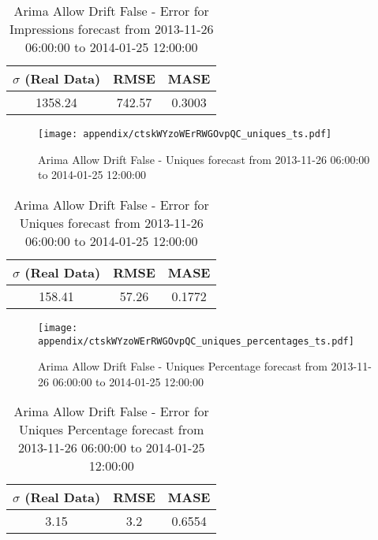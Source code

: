 \begin{table}[H]
\centering
\footnotesize
\begin{tabular}{ccc}
$\sigma$ (Real Data) & RMSE & MASE   \\ \hline
1358.24 & 742.57 & 0.3003 \\
\end{tabular}

\vspace{0.5cm}

\caption{
Arima Allow Drift False - Error for Impressions forecast from 2013-11-26 06:00:00 to 2014-01-25 12:00:00}
\end{table}

\begin{figure}[H] \begin{center} \leavevmode
\texttt{[image: appendix/ctskWYzoWErRWGOvpQC\_uniques\_ts.pdf]} \caption{
Arima Allow Drift False - Uniques forecast from 2013-11-26 06:00:00 to 2014-01-25 12:00:00} \label{fig:appendix/ctskWYzoWErRWGOvpQC_uniques_ts.pdf} \end{center}
\end{figure}

\begin{table}[H]
\centering
\footnotesize
\begin{tabular}{ccc}
$\sigma$ (Real Data) & RMSE & MASE   \\ \hline
158.41 & 57.26 & 0.1772 \\
\end{tabular}

\vspace{0.5cm}

\caption{
Arima Allow Drift False - Error for Uniques forecast from 2013-11-26 06:00:00 to 2014-01-25 12:00:00}
\end{table}

\begin{figure}[H] \begin{center} \leavevmode
\texttt{[image: appendix/ctskWYzoWErRWGOvpQC\_uniques\_percentages\_ts.pdf]} \caption{
Arima Allow Drift False - Uniques Percentage forecast from 2013-11-26 06:00:00 to 2014-01-25 12:00:00} \label{fig:appendix/ctskWYzoWErRWGOvpQC_uniques_percentages_ts.pdf} \end{center}
\end{figure}

\begin{table}[H]
\centering
\footnotesize
\begin{tabular}{ccc}
$\sigma$ (Real Data) & RMSE & MASE   \\ \hline
3.15 & 3.2 & 0.6554 \\
\end{tabular}

\vspace{0.5cm}

\caption{
Arima Allow Drift False - Error for Uniques Percentage forecast from 2013-11-26 06:00:00 to 2014-01-25 12:00:00}
\end{table}

